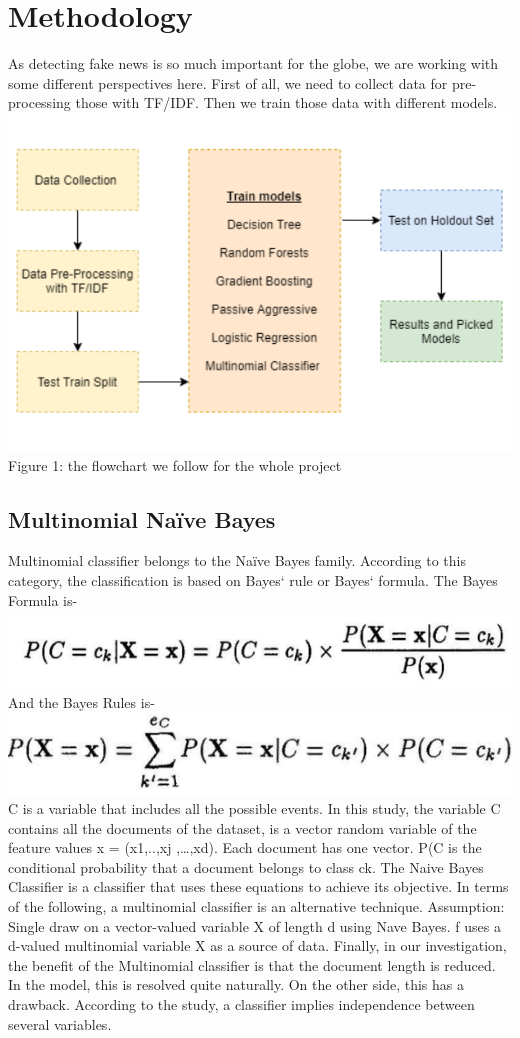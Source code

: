 \documentclass[conference]{IEEEtran}
\begin{document}
\section{Methodology}
As detecting fake news is so much important for the globe, we are working with some different perspectives here. First of all, we need to collect data for pre-processing those with TF/IDF. Then we train those data with different models. 
\includegraphics[scale=0.55]{figA.png}
Figure 1: the flowchart we follow for the whole project

\subsection{Multinomial Naïve Bayes}
Multinomial classifier belongs to the Naïve Bayes family. According to this category, the classification is based on Bayes` rule or Bayes` formula. The Bayes Formula is- 
\includegraphics[scale=0.55]{figB.png}
And the Bayes Rules is-
\includegraphics[scale=0.55]{figC.png}
C is a variable that includes all the possible events. In this study, the variable C contains all the documents of the dataset, is a vector random variable of the feature values x = (x1,..,xj ,…,xd). Each document has one vector. P(C is the conditional probability that a document belongs to class ck.
The Naive Bayes Classifier is a classifier that uses these equations to achieve its objective. In terms of the following, a multinomial classifier is an alternative technique.
Assumption:
Single draw on a vector-valued variable X of length d using Nave Bayes.
f uses a d-valued multinomial variable X as a source of data.
Finally, in our investigation, the benefit of the Multinomial classifier is that the document length is reduced. In the model, this is resolved quite naturally. On the other side, this has a drawback. According to the study, a classifier implies independence between several variables.
\end{document}
